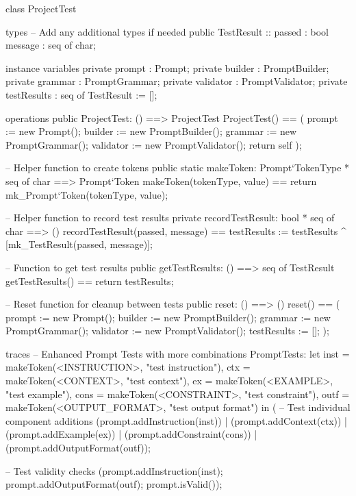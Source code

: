 \documentclass[a4paper]{article}
\begin{document}
\title{}
\author{}
\begin{vdm_al}
class ProjectTest

types
    -- Add any additional types if needed
    public TestResult :: 
        passed : bool
        message : seq of char;

instance variables
    private prompt : Prompt;
    private builder : PromptBuilder;
    private grammar : PromptGrammar;
    private validator : PromptValidator;
    private testResults : seq of TestResult := [];

operations
    public ProjectTest: () ==> ProjectTest
    ProjectTest() ==
    (
        prompt := new Prompt();
        builder := new PromptBuilder();
        grammar := new PromptGrammar();
        validator := new PromptValidator();
        return self
    );

    -- Helper function to create tokens
    public static makeToken: Prompt`TokenType * seq of char ==> Prompt`Token
    makeToken(tokenType, value) ==
        return mk_Prompt`Token(tokenType, value);

    -- Helper function to record test results
    private recordTestResult: bool * seq of char ==> ()
    recordTestResult(passed, message) ==
        testResults := testResults ^ [mk_TestResult(passed, message)];

    -- Function to get test results
    public getTestResults: () ==> seq of TestResult
    getTestResults() ==
        return testResults;

    -- Reset function for cleanup between tests
    public reset: () ==> ()
    reset() ==
    (
        prompt := new Prompt();
        builder := new PromptBuilder();
        grammar := new PromptGrammar();
        validator := new PromptValidator();
        testResults := [];
    );

traces
    -- Enhanced Prompt Tests with more combinations
    PromptTests: 
        let inst = makeToken(<INSTRUCTION>, "test instruction"),
            ctx = makeToken(<CONTEXT>, "test context"),
            ex = makeToken(<EXAMPLE>, "test example"),
            cons = makeToken(<CONSTRAINT>, "test constraint"),
            outf = makeToken(<OUTPUT_FORMAT>, "test output format") in
        (
            -- Test individual component additions
            (prompt.addInstruction(inst)) |
            (prompt.addContext(ctx)) |
            (prompt.addExample(ex)) |
            (prompt.addConstraint(cons)) |
            (prompt.addOutputFormat(outf));

            -- Test validity checks
            (prompt.addInstruction(inst);
             prompt.addOutputFormat(outf);
             prompt.isValid());


\end{vdm_al}
\end{document}
